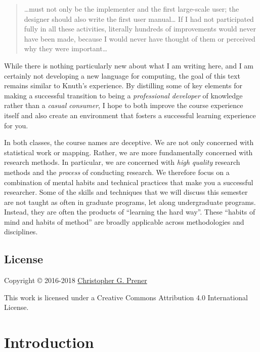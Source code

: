 \documentclass[]{book}
\theoremstyle{definition}
\theoremstyle{definition}
\theoremstyle{definition}
\theoremstyle{remark}
\begin{document}
\begin{quote}
\ldots{}must not only be the implementer and the first large-scale user;
the designer should also write the first user manual\ldots{} If I had
not participated fully in all these activities, literally hundreds of
improvements would never have been made, because I would never have
thought of them or perceived why they were important\ldots{}
\end{quote}

While there is nothing particularly new about what I am writing here,
and I am certainly not developing a new language for computing, the goal
of this text remains similar to Knuth's experience. By distilling some
of key elements for making a successful transition to being a
\emph{professional developer} of knowledge rather than a \emph{casual
consumer}, I hope to both improve the course experience itself and also
create an environment that fosters a successful learning experience for
you.

In both classes, the course names are deceptive. We are not only
concerned with statistical work or mapping. Rather, we are more
fundamentally concerned with research methods. In particular, we are
concerned with \emph{high quality} research methods and the
\emph{process} of conducting research. We therefore focus on a
combination of mental habits and technical practices that make you a
successful researcher. Some of the skills and techniques that we will
discuss this semester are not taught as often in graduate programs, let
along undergraduate programs. Instead, they are often the products of
``learning the hard way''. These ``habits of mind and habits of method''
are broadly applicable across methodologies and disciplines.

\section*{License}\label{license}

Copyright © 2016-2018 \href{https://chris-prener.github.io}{Christopher
G. Prener}

This work is licensed under a Creative Commons Attribution 4.0
International License.

\chapter{Introduction}\label{intro}
\end{document}
